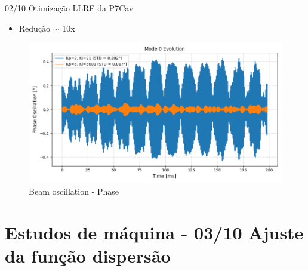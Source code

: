 \documentclass{beamer}					%
\begin{document}
\begin{frame}{02/10 Otimização LLRF da P7Cav}

\begin{itemize}
		\item Redução $\sim$ 10x
\end{itemize}

\begin{figure}[H]
		\centering
        \includegraphics[width=.9\textwidth]{figures/llrf-phase-oscillations.png}
        \caption{Beam oscillation - Phase}
        \label{fig:figure1}
\end{figure}

\end{frame}
 


\section{Estudos de máquina - 03/10 Ajuste da função dispersão}
\end{document}
